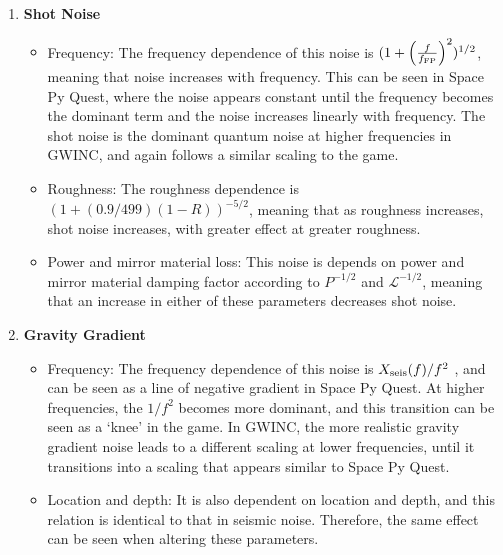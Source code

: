 \documentclass{article}
\begin{document}
\begin{enumerate}
    \item \textbf{Shot Noise}
    \begin{itemize}
    \item Frequency: The frequency dependence of this noise is
      $(1+\left(\frac{f}{f_{\rm FP}}\right)^2)^{1/2}$, meaning that noise
      increases with frequency. This can be seen in Space Py Quest,
      where the noise appears constant until the frequency becomes the
      dominant term and the noise increases linearly with
      frequency. The shot noise is the dominant quantum noise at
      higher frequencies in GWINC, and again follows a similar scaling
      to the game. 
    \item Roughness: The roughness dependence is
      $(1+(0.9/499)(1-R))^{-5/2}$, meaning that as roughness
      increases, shot noise increases, with greater effect at greater
      roughness. 
    \item Power and mirror material loss: This noise is depends on
      power and mirror material damping factor according to $P^{-1/2}$
      and $\mathcal{L}^{-1/2}$, meaning that an increase in either of
      these parameters decreases shot noise.
    \end{itemize}
    
    \item \textbf{Gravity Gradient}
    \begin{itemize}
    \item Frequency: The frequency dependence of this noise is
      $X_{\rm seis}(f)/f^2$ , and can be seen as a line of negative
      gradient in Space Py Quest. At higher frequencies, the $1/f^2$
      becomes more dominant, and this transition can be seen as a
      `knee' in the game. In GWINC, the more realistic gravity
      gradient noise leads to a different scaling at lower
      frequencies, until it transitions into a scaling that appears
      similar to Space Py Quest. 
    \item Location and depth: It is also dependent on location and
      depth, and this relation is identical to that in seismic
      noise. Therefore, the same effect can be seen when altering
      these parameters. 
    \end{itemize}
    

\end{enumerate}
\end{document}
